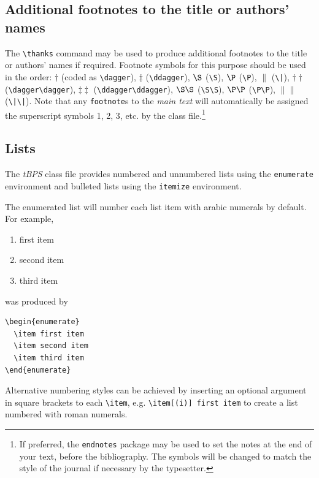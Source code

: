 \documentclass{tBPS2e}
\theoremstyle{plain}
\theoremstyle{definition}
\theoremstyle{remark}
\begin{document}
\subsection{Additional footnotes to the title or authors' names}

The \verb"\thanks" command may be used to produce additional footnotes to the title or authors' names if required.
Footnote symbols for this purpose should be used in the order:
$\dagger$ (coded as \verb"\dagger"), $\ddagger$ (\verb"\ddagger"), $\S$ (\verb"\S"), $\P$ (\verb"\P"), $\|$ (\verb"\|"),
$\dagger\dagger$ (\verb"\dagger\dagger"), $\ddagger\ddagger$ (\verb"\ddagger\ddagger"), $\S\S$ (\verb"\S\S"),\break
$\P\P$ (\verb"\P\P"), $\|\|$ (\verb"\|\|").
Note that any \verb"footnote"s to the \emph{main text} will automatically be assigned the superscript
 symbols 1, 2, 3, etc. by the class file.\footnote{If preferred, the \texttt{endnotes} package
 may be used to set the notes at the end of your text, before the bibliography.
 The symbols will be changed to match the style of the journal if necessary by the typesetter.}


\subsection{Lists}

The \textit{tBPS} class file provides numbered and unnumbered lists using the \texttt{enumerate} environment and bulleted
lists using the \texttt{itemize} environment.

The enumerated list will number each list item with arabic numerals by default. For example,
\begin{enumerate}
  \item first item
  \item second item
  \item third item
\end{enumerate}
was produced by
\begin{verbatim}
\begin{enumerate}
  \item first item
  \item second item
  \item third item
\end{enumerate}
\end{verbatim}
Alternative numbering styles can be achieved by inserting an optional argument in square brackets to each \verb"\item", e.g. \verb"\item[(i)] first item" to create a list numbered with roman numerals.
\end{document}
